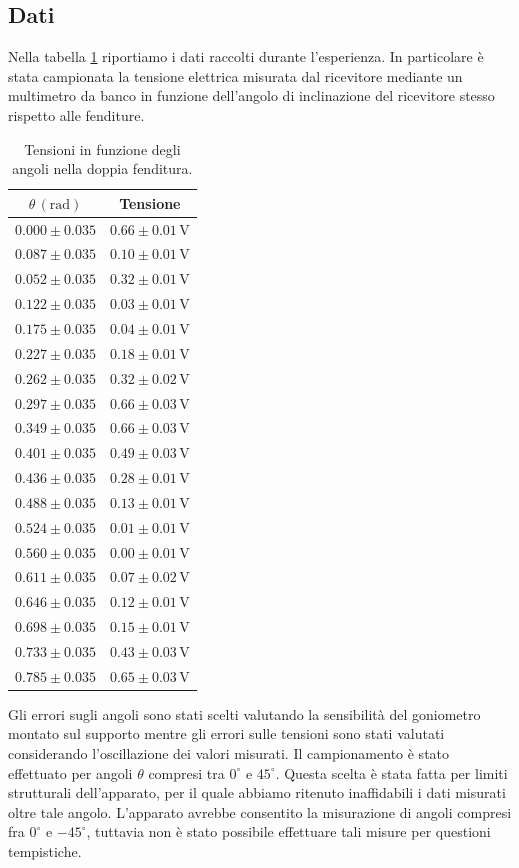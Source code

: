 \documentclass[a4paper]{article}
\begin{document}
\subsection{Dati}
Nella tabella \ref{tab: dati doppia fenditura} riportiamo i dati raccolti durante l'esperienza. In particolare è stata campionata la tensione elettrica misurata dal ricevitore mediante un multimetro da banco in funzione dell'angolo di inclinazione del ricevitore stesso rispetto alle fenditure. 
\begin{table}[H]
\centering
\begin{tabular}{|c|c|}
\hline
$\theta\,(\text{rad})$ & Tensione \\
\hline
$0.000 \pm 0.035$ & $0.66 \pm 0.01\,\text{V}$ \\
$0.087 \pm 0.035$ & $0.10 \pm 0.01\,\text{V}$ \\
$0.052 \pm 0.035$ & $0.32 \pm 0.01\,\text{V}$ \\
$0.122 \pm 0.035$ & $0.03 \pm 0.01\,\text{V}$ \\
$0.175 \pm 0.035$ & $0.04 \pm 0.01\,\text{V}$ \\
$0.227 \pm 0.035$ & $0.18 \pm 0.01\,\text{V}$ \\
$0.262 \pm 0.035$ & $0.32 \pm 0.02\,\text{V}$ \\
$0.297 \pm 0.035$ & $0.66 \pm 0.03\,\text{V}$ \\
$0.349 \pm 0.035$ & $0.66 \pm 0.03\,\text{V}$ \\
$0.401 \pm 0.035$ & $0.49 \pm 0.03\,\text{V}$ \\
$0.436 \pm 0.035$ & $0.28 \pm 0.01\,\text{V}$ \\
$0.488 \pm 0.035$ & $0.13 \pm 0.01\,\text{V}$ \\
$0.524 \pm 0.035$ & $0.01 \pm 0.01\,\text{V}$ \\
$0.560 \pm 0.035$ & $0.00 \pm 0.01\,\text{V}$ \\
$0.611 \pm 0.035$ & $0.07 \pm 0.02\,\text{V}$ \\
$0.646 \pm 0.035$ & $0.12 \pm 0.01\,\text{V}$ \\
$0.698 \pm 0.035$ & $0.15 \pm 0.01\,\text{V}$ \\
$0.733 \pm 0.035$ & $0.43 \pm 0.03\,\text{V}$ \\
$0.785 \pm 0.035$ & $0.65 \pm 0.03\,\text{V}$ \\
\hline
\end{tabular}
\caption{Tensioni in funzione degli angoli nella doppia fenditura.}
\label{tab: dati doppia fenditura}
\end{table}
Gli errori sugli angoli sono stati scelti valutando la sensibilità del goniometro montato sul supporto mentre gli errori sulle tensioni sono stati valutati considerando l'oscillazione dei valori misurati. Il campionamento è stato effettuato per angoli $\theta$ compresi tra $0^\circ$ e $45^\circ$. Questa scelta è stata fatta per limiti strutturali dell'apparato, per il quale abbiamo ritenuto inaffidabili i dati misurati oltre tale angolo. L'apparato avrebbe consentito la misurazione di angoli compresi fra $0^\circ$ e $-45^\circ$, tuttavia non è stato possibile effettuare tali misure per questioni tempistiche.
\end{document}
